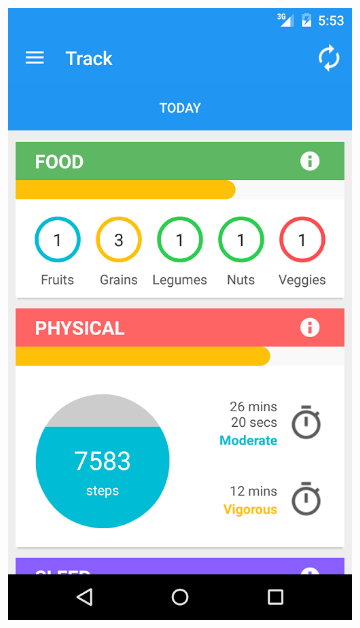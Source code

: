 \begin{figure}[h]
\begin{subfigure}[t]{0.3\textwidth}
        \includegraphics[width=\textwidth]{Files/prevention-study-3/figures/gm-new-log}
        \caption{}
        \label{fig: gm-new-log}
    \end{subfigure}
    \hfill
    \begin{subfigure}[t]{0.3\textwidth}
        \centering

\end{subfigure}
\end{figure}

